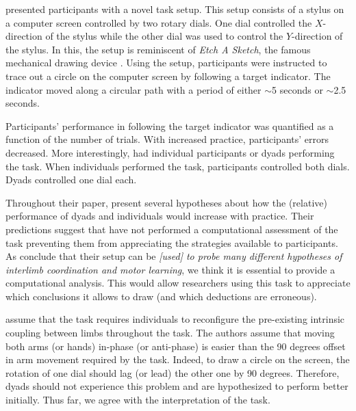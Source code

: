 \documentclass[]{article}
\title{}
\author{}
\begin{document}
\maketitle

\begin{abstract}

\end{abstract}

\citet{Annand2020} presented participants with a novel task setup. This setup consists of a stylus on a computer screen controlled by two rotary dials. One dial controlled the $X$-direction of the stylus while the other dial was used to control the $Y$-direction of the stylus. In this, the setup is reminiscent of \textit{Etch A Sketch}, the famous mechanical drawing device \citep{EtchASketch}. Using the setup, participants were instructed to trace out a circle on the computer screen by following a target indicator. The indicator moved along a circular path with a period of either $\sim$5 seconds or  $\sim$2.5 seconds.

Participants' performance in following the target indicator was quantified as a function of the number of trials. With increased practice, participants' errors decreased. More interestingly, \citet{Annand2020} had individual participants or dyads performing the task. When individuals performed the task, participants controlled both dials. Dyads controlled one dial each.

Throughout their paper, \citet{Annand2020} present several hypotheses about how the (relative) performance of dyads and individuals would increase with practice. Their predictions suggest that \citet{Annand2020} have not performed a computational assessment of the task preventing them from appreciating the strategies available to participants. As \citet{Annand2020} conclude that their setup can be \textit{[used] to probe many different hypotheses of interlimb coordination and motor learning}, we think it is essential to provide a computational analysis. This would allow researchers using this task to appreciate which conclusions it allows to draw (and which deductions are erroneous).

\citet{Annand2020} assume that the task requires individuals to reconfigure the pre-existing intrinsic coupling between limbs throughout the task. The authors assume that moving both arms (or hands) in-phase (or anti-phase) is easier than the 90 degrees offset in arm movement required by the task. Indeed, to draw a circle on the screen, the rotation of one dial should lag (or lead) the other one by 90 degrees. Therefore, dyads should not experience this problem and are hypothesized to perform better initially. Thus far, we agree with the interpretation of the task.
\end{document}
